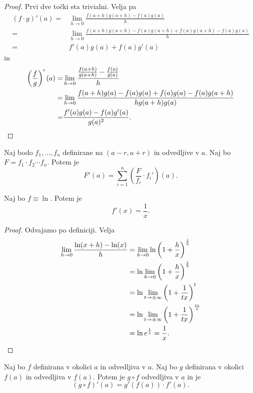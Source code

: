 \documentclass[12pt, a4paper]{article}
\begin{document}
\begin{proof}
Prvi dve točki sta trivialni. Velja pa
\begin{align*}
(f\cdot g)'(a)=&\lim_{h\to 0}\frac{f(a+h)g(a+h)-f(a)g(a)}{h}
\\
=&\lim_{h\to 0}\frac{f(a+h)g(a+h)-f(a)g(a+h)+f(a)g(a+h)-f(a)g(a)}{h}
\\
=&f'(a)g(a)+f(a)g'(a)
\end{align*}
in
\begin{align*}
\left(\frac{f}{g}\right)'(a)=&\lim_{h\to 0}\frac{\frac{f(a+h)}{g(a+h)}-\frac{f(a)}{g(a)}}{h}
\\
=&\lim_{h\to 0}\frac{f(a+h)g(a)-f(a)g(a)+f(a)g(a)-f(a)g(a+h)}{hg(a+h)g(a)}
\\
=&\frac{f'(a)g(a)-f(a)g'(a)}{g(a)^2}.\qedhere
\end{align*}
\end{proof}

\begin{posledica}
Naj bodo $f_1,\dots,f_n$ definirane na $(a-r,a+r)$ in odvedljive v $a$. Naj bo $F=f_1\cdot f_2\cdots f_n$. Potem je
\[
F'(a)=\sum_{i=1}^n\left(\frac{F}{f_i}\cdot f_i'\right)(a).
\]
\end{posledica}

\begin{posledica}
Naj bo $f\equiv\ln$. Potem je
\[
f'(x)=\frac{1}{x}.
\]
\end{posledica}

\begin{proof}
Odvajamo po definiciji. Velja
\begin{align*}
\lim_{h\to 0}\frac{\ln(x+h)-\ln(x)}{h}
&=\lim_{h\to 0}\ln\left(1+\frac{h}{x}\right)^{\frac{1}{h}}
\\
&=\ln\lim_{h\to 0}\left(1+\frac{h}{x}\right)^{\frac{1}{h}}
\\
&=\ln\lim_{t\to\pm\infty}\left(1+\frac{1}{tx}\right)^t
\\
&=\ln\lim_{t\to\pm\infty}\left(1+\frac{1}{tx}\right)^{\frac{tx}{x}}
\\
&=\ln e^{\frac{1}{x}}=\frac{1}{x}.\qedhere
\end{align*}
\end{proof}

\begin{izrek}
Naj bo $f$ definirana v okolici $a$ in odvedljiva v $a$. Naj bo $g$ definirana v okolici $f(a)$ in odvedljiva v $f(a)$. Potem je $g\circ f$ odvedljiva v $a$ in je
\[
(g\circ f)'(a)=g'(f(a))\cdot f'(a).
\]
\end{izrek}
\end{document}
